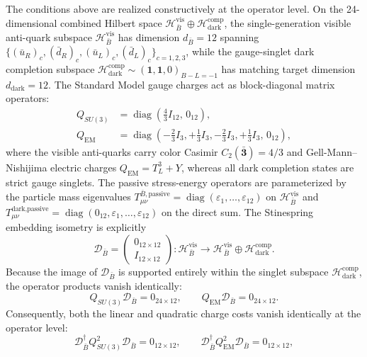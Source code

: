 \documentclass[11pt,letterpaper]{article}
\theoremstyle{plain}
\begin{document}
The conditions above are realized constructively at the operator level.
On the 24-dimensional combined Hilbert space
$\mathcal{H}_{\bar B}^{\text{vis}} \oplus \mathcal{H}_{\text{dark}}^{\text{comp}}$,
the single-generation visible anti-quark subspace $\mathcal{H}_{\bar B}^{\text{vis}}$
has dimension $d_{\bar B} = 12$ spanning
$\{(\bar u_R)_c, (\bar d_R)_c, (\bar u_L)_c, (\bar d_L)_c\}_{c=1,2,3}$,
while the gauge-singlet dark completion subspace $\mathcal{H}_{\text{dark}}^{\text{comp}} \sim (\mathbf{1}, \mathbf{1}, 0)_{B-L=-1}$
has matching target dimension $d_{\text{dark}} = 12$.
The Standard Model gauge charges act as block-diagonal matrix operators:
\begin{align}
Q_{SU(3)} &= \operatorname{diag}\left(\tfrac{4}{3} I_{12}, \, 0_{12}\right), \\
Q_{\mathrm{EM}} &= \operatorname{diag}\left(-\tfrac{2}{3}I_3, +\tfrac{1}{3}I_3, -\tfrac{2}{3}I_3, +\tfrac{1}{3}I_3, \, 0_{12}\right),
\end{align}
where the visible anti-quarks carry color Casimir $C_2(\mathbf{\bar 3}) = 4/3$ and Gell-Mann--Nishijima electric charges $Q_{\mathrm{EM}} = T_L^3 + Y$, whereas all dark completion states are strict gauge singlets.
The passive stress-energy operators are parameterized by the particle mass eigenvalues
$T_{\mu\nu}^{\bar B, \text{passive}} = \operatorname{diag}(\varepsilon_1, \dots, \varepsilon_{12})$ on $\mathcal{H}_{\bar B}^{\text{vis}}$ and
$T_{\mu\nu}^{\text{dark,passive}} = \operatorname{diag}(0_{12}, \varepsilon_1, \dots, \varepsilon_{12})$ on the direct sum.
The Stinespring embedding isometry is explicitly
\begin{equation}
\mathcal{D}_{\bar B} = \begin{pmatrix} 0_{12 \times 12} \\ I_{12 \times 12} \end{pmatrix}: \mathcal{H}_{\bar B}^{\text{vis}} \to \mathcal{H}_{\bar B}^{\text{vis}} \oplus \mathcal{H}_{\text{dark}}^{\text{comp}}.
\end{equation}
Because the image of $\mathcal{D}_{\bar B}$ is supported entirely within the singlet subspace $\mathcal{H}_{\text{dark}}^{\text{comp}}$, the operator products vanish identically:
\begin{equation}
Q_{SU(3)} \mathcal{D}_{\bar B} = 0_{24 \times 12}, \qquad Q_{\mathrm{EM}} \mathcal{D}_{\bar B} = 0_{24 \times 12}.
\end{equation}
Consequently, both the linear and quadratic charge costs vanish identically at the operator level:
\begin{equation}
\mathcal{D}_{\bar B}^\dagger Q_{SU(3)}^2 \mathcal{D}_{\bar B} = 0_{12 \times 12}, \qquad \mathcal{D}_{\bar B}^\dagger Q_{\mathrm{EM}}^2 \mathcal{D}_{\bar B} = 0_{12 \times 12},
\end{equation}
\end{document}
